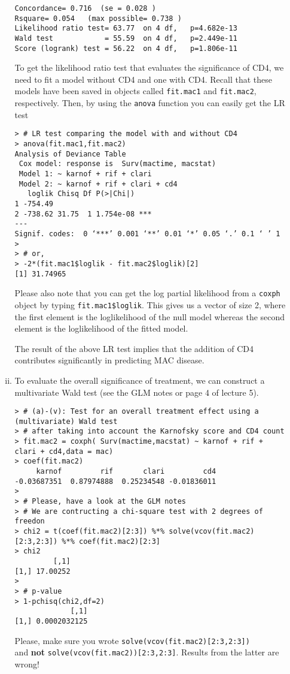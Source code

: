 \begin{enumerate}[(a)]
\begin{enumerate}[(i)]
\begin{footnotesize}
\begin{verbatim}
Concordance= 0.716  (se = 0.028 )
Rsquare= 0.054   (max possible= 0.738 )
Likelihood ratio test= 63.77  on 4 df,   p=4.682e-13
Wald test            = 55.59  on 4 df,   p=2.449e-11
Score (logrank) test = 56.22  on 4 df,   p=1.806e-11
\end{verbatim}
\end{footnotesize}
To get the likelihood ratio test that evaluates the significance of CD4, we need to fit a model without CD4 and one with CD4. Recall that these models have been saved in objects called \verb|fit.mac1| and \verb|fit.mac2|, respectively. Then, by using the \verb|anova| function you can easily get the LR test
\begin{footnotesize}
\begin{verbatim}
> # LR test comparing the model with and without CD4
> anova(fit.mac1,fit.mac2)
Analysis of Deviance Table
 Cox model: response is  Surv(mactime, macstat)
 Model 1: ~ karnof + rif + clari
 Model 2: ~ karnof + rif + clari + cd4
   loglik Chisq Df P(>|Chi|)    
1 -754.49                       
2 -738.62 31.75  1 1.754e-08 ***
---
Signif. codes:  0 ‘***’ 0.001 ‘**’ 0.01 ‘*’ 0.05 ‘.’ 0.1 ‘ ’ 1
> 
> # or,
> -2*(fit.mac1$loglik - fit.mac2$loglik)[2]
[1] 31.74965
\end{verbatim}
\end{footnotesize}
Please also note that you can get the log partial likelihood from a \verb|coxph| object by typing \verb|fit.mac1$loglik|. This gives us a vector of size 2, where the first element is the loglikelihood of the null model whereas the second element is the loglikelihood of the fitted model.

The result of the above LR test implies that the addition of CD4 contributes significantly in 
predicting MAC disease.
\item To evaluate the overall significance of treatment, we can construct a multivariate Wald test (see the GLM notes or page 4 of lecture 5).
\begin{footnotesize}
\begin{verbatim}
> # (a)-(v): Test for an overall treatment effect using a (multivariate) Wald test
> # after taking into account the Karnofsky score and CD4 count
> fit.mac2 = coxph( Surv(mactime,macstat) ~ karnof + rif + clari + cd4,data = mac)
> coef(fit.mac2)
     karnof         rif       clari         cd4 
-0.03687351  0.87974888  0.25234548 -0.01836011 
> 
> # Please, have a look at the GLM notes
> # We are contructing a chi-square test with 2 degrees of freedon
> chi2 = t(coef(fit.mac2)[2:3]) %*% solve(vcov(fit.mac2)[2:3,2:3]) %*% coef(fit.mac2)[2:3]
> chi2
         [,1]
[1,] 17.00252
> 
> # p-value
> 1-pchisq(chi2,df=2)
             [,1]
[1,] 0.0002032125
\end{verbatim}
\end{footnotesize}
Please, make sure you wrote \verb|solve(vcov(fit.mac2)[2:3,2:3])| \\
and \textbf{not} \verb|solve(vcov(fit.mac2))[2:3,2:3]|. Results from the latter are wrong!


\end{enumerate}
\end{enumerate}
